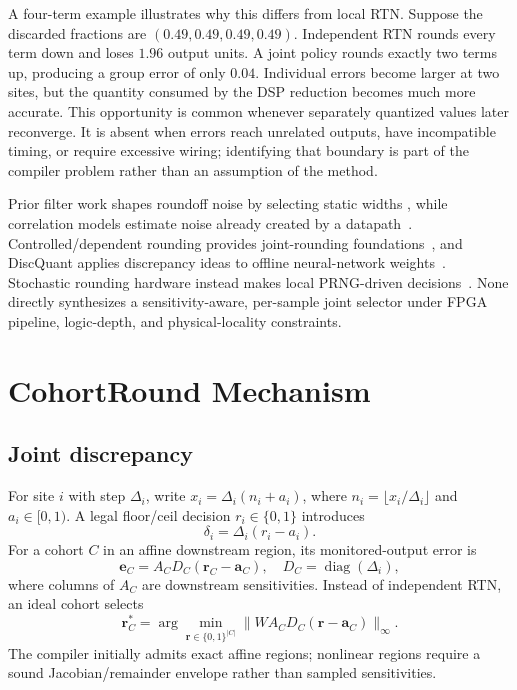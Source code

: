\documentclass[conference]{IEEEtran}
\newcommand{\vect}[1]{\bm{#1}}
\newcommand{\diag}{\operatorname{diag}}
\begin{document}
A four-term example illustrates why this differs from local RTN. Suppose the
discarded fractions are $(0.49,0.49,0.49,0.49)$. Independent RTN rounds every
term down and loses $1.96$ output units. A joint policy rounds exactly two terms
up, producing a group error of only $0.04$. Individual errors become larger at
two sites, but the quantity consumed by the DSP reduction becomes much more
accurate. This opportunity is common whenever separately quantized values later
reconverge. It is absent when errors reach unrelated outputs, have incompatible
timing, or require excessive wiring; identifying that boundary is part of the
compiler problem rather than an assumption of the method.

Prior filter work shapes roundoff noise by selecting static widths
\cite{constantinides2000}, while correlation models estimate noise already
created by a datapath~\cite{naud2012}. Controlled/dependent rounding provides
joint-rounding foundations~\cite{coxernst1982,gandhi2006}, and DiscQuant applies
discrepancy ideas to offline neural-network weights~\cite{chee2025}. Stochastic
rounding hardware instead makes local PRNG-driven decisions~\cite{mikaitis2021}.
None directly synthesizes a sensitivity-aware, per-sample joint selector under
FPGA pipeline, logic-depth, and physical-locality constraints.

\section{CohortRound Mechanism}

\subsection{Joint discrepancy}
For site $i$ with step $\Delta_i$, write
$x_i=\Delta_i(n_i+a_i)$, where $n_i=\lfloor x_i/\Delta_i\rfloor$ and
$a_i\in[0,1)$. A legal floor/ceil decision $r_i\in\{0,1\}$ introduces
\begin{equation}
 \delta_i=\Delta_i(r_i-a_i).
 \label{eq:local}
\end{equation}
For a cohort $C$ in an affine downstream region, its monitored-output error is
\begin{equation}
 \vect e_C=A_CD_C(\vect r_C-\vect a_C),\quad
 D_C=\diag(\Delta_i),
 \label{eq:vector}
\end{equation}
where columns of $A_C$ are downstream sensitivities. Instead of independent
RTN, an ideal cohort selects
\begin{equation}
 \vect r_C^*=\arg\min_{\vect r\in\{0,1\}^{|C|}}
 \|WA_CD_C(\vect r-\vect a_C)\|_\infty .
 \label{eq:oracle}
\end{equation}
The compiler initially admits exact affine regions; nonlinear regions require a
sound Jacobian/remainder envelope rather than sampled sensitivities.
\end{document}
